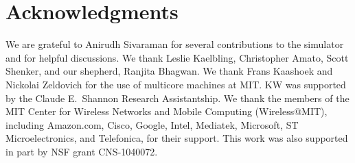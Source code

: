 \section{Acknowledgments}

We are grateful to Anirudh Sivaraman for several contributions to the
simulator and for helpful discussions. We thank Leslie Kaelbling,
Christopher Amato, Scott Shenker, and our shepherd, Ranjita
Bhagwan. We thank Frans Kaashoek and Nickolai Zeldovich for the use of
multicore machines at MIT. KW was supported by the Claude E.~Shannon Research
Assistantship. We thank the members of the MIT Center for Wireless
Networks and Mobile Computing (Wireless@MIT), including Amazon.com,
Cisco, Google, Intel, Mediatek, Microsoft, ST Microelectronics, and
Telefonica, for their support. This work was also supported in part by
NSF grant CNS-1040072.
